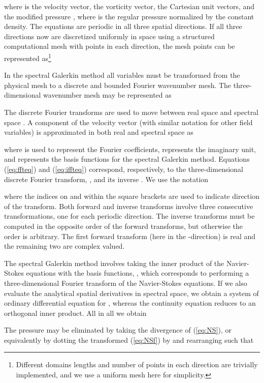 \documentclass[final,3p,times,twocolumn]{elsarticle}
\begin{document}
where  is the velocity vector,  the vorticity vector,  the Cartesian unit vectors, and the modified pressure , where  is the regular pressure normalized by the constant density. The equations are periodic in all three spatial directions. If all three directions now are discretized uniformly in space using a structured computational mesh with  points in each direction, the mesh points can be represented as\footnote{Different domains lengths and number of points in each direction are trivially implemented, and we use a uniform mesh here for simplicity.}

In the spectral Galerkin method all variables must be transformed from the physical mesh  to a discrete and bounded Fourier wavenumber mesh. The three-dimensional wavenumber mesh may be represented as

The discrete Fourier transforms are used to move between real space  and spectral space . A component of the velocity vector (with similar notation for other field variables) is approximated in both real and spectral space as

where  is used to represent the Fourier coefficients,  represents the imaginary unit, and  represents the basis functions for the spectral Galerkin method. Equations (\ref{eq:ffteq}) and (\ref{eq:iffteq}) correspond, respectively, to the three-dimensional discrete Fourier transform, , and its inverse . We use the notation


where the indices on  and  within the square 
brackets are used to indicate direction of the transform. Both forward and 
inverse transforms involve three consecutive transformations, one for each 
periodic direction. The inverse transforms must be computed in the opposite 
order of the forward transforms, but otherwise the order is arbitrary. The 
first forward transform (here in the -direction) is real and the remaining 
two are complex valued.



The spectral Galerkin method involves taking the inner product of the Navier-Stokes equations with the basis functions, , which corresponds to performing a three-dimensional Fourier transform of the Navier-Stokes equations. If we also evaluate the analytical spatial derivatives in spectral space, we obtain a system of ordinary differential equation for , whereas the continuity equation reduces to an orthogonal inner product. All in all we obtain

The pressure may be eliminated by taking the divergence of (\ref{eq:NS}), or equivalently by dotting the transformed (\ref{eq:NSf}) by  and rearranging such that
\end{document}
